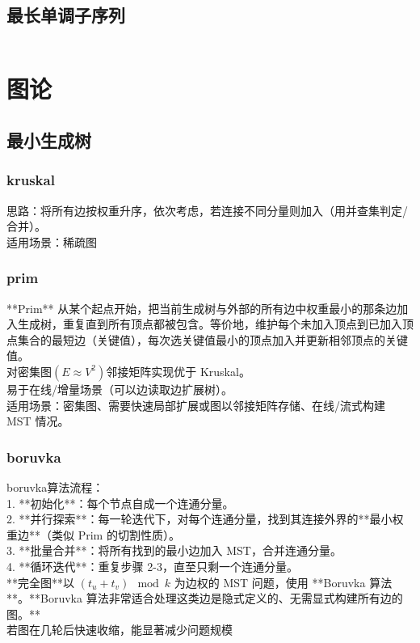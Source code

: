 \documentclass[titlepage, a4paper]{report}
\newcommand{\cppcode}[1]{  
    \inputminted[mathescape]{cpp}{source/#1}  
}
\begin{document}
\section{最长单调子序列}
\cppcode{LIS.cpp}





\chapter{图论}

\section{最小生成树}
\subsection{kruskal}
思路：将所有边按权重升序，依次考虑，若连接不同分量则加入（用并查集判定/合并）。\\
适用场景：稀疏图
\subsection{prim}
**Prim** 从某个起点开始，把当前生成树与外部的所有边中权重最小的那条边加入生成树，重复直到所有顶点都被包含。等价地，维护每个未加入顶点到已加入顶点集合的最短边（关键值），每次选关键值最小的顶点加入并更新相邻顶点的关键值。\\
对密集图$(E≈V^2)$邻接矩阵实现优于 Kruskal。\\
易于在线/增量场景（可以边读取边扩展树）。\\
适用场景：密集图、需要快速局部扩展或图以邻接矩阵存储、在线/流式构建 MST 情况。\\
\subsection{boruvka}
boruvka算法流程：\\
1. **初始化**：每个节点自成一个连通分量。\\
2. **并行探索**：每一轮迭代下，对每个连通分量，找到其连接外界的**最小权重边**（类似 Prim 的切割性质）。\\
3. **批量合并**：将所有找到的最小边加入 MST，合并连通分量。\\
4. **循环迭代**：重复步骤 2-3，直至只剩一个连通分量。\\
**完全图**以 $(t_u+t_v) \mod k$ 为边权的 MST 问题，使用 **Boruvka 算法**。**Boruvka 算法非常适合处理这类边是隐式定义的、无需显式构建所有边的图。**\\
若图在几轮后快速收缩，能显著减少问题规模\\
\end{document}
